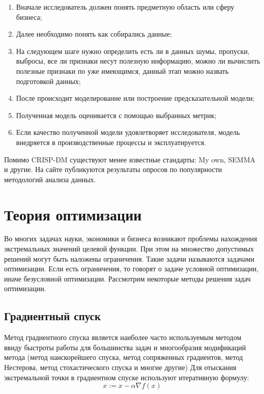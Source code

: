 \begin{enumerate}[label=\arabic*.]
    \item Вначале исследователь должен понять предметную область или сферу бизнеса;
    \item Далее необходимо понять как собирались данные;
    \item На следующем шаге нужно определить есть ли в данных шумы, пропуски, выбросы, все ли признаки несут полезную информацию, можно ли вычислить полезные признаки по уже имеющимся, данный этап можно назвать подготовкой данных;
    \item После происходит моделирование или построение предсказательной модели;
    \item Полученная модель оценивается с помощью выбранных метрик;
    \item Если качество полученной модели удовлетворяет исследователя, модель внедряется в производственные процессы и эксплуатируется.
\end{enumerate}
Помимо CRISP-DM существуют менее известные стандарты: My own, SEMMA и другие. На сайте \cite{poll:crisp_dm} публикуются результаты опросов по популярности методологий анализа данных.



\section{Теория оптимизации}

Во многих задачах науки, экономики и бизнеса возникают проблемы нахождения экстремальных значений целевой функции. При этом на множество допустимых решений могут быть наложены ограничения. Такие задачи называются задачами оптимизации. Если есть ограничения, то говорят о задаче условной оптимизации, иначе безусловной оптимизации. Рассмотрим некоторые методы решения задач оптимизации.


\subsection{Градиентный спуск}

Метод градиентного спуска является наиболее часто используемым методом ввиду быстроты работы для большинства задач и многообразия модификаций метода (метод наискорейшего спуска, метод сопряженных градиентов, метод Нестерова, метод стохастического спуска и многие другие)
Для отыскания экстремальной точки в градиентном спуске используют итеративную формулу:
$$ x := x - \alpha \nabla f(x) $$

